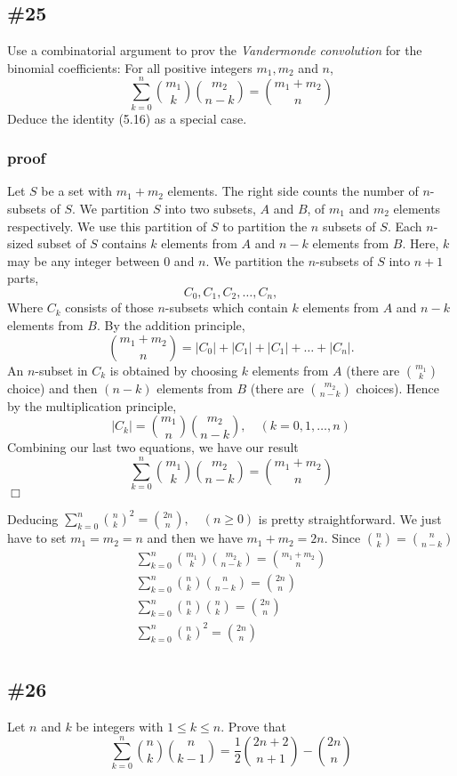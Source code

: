 \documentclass{article}
\newcommand{\abs}[1]{\left\lvert #1 \right\rvert}
\begin{document}
\subsection*{\#25}
Use a combinatorial argument to prov the \emph{Vandermonde convolution} for the binomial coefficients: For all positive integers $m_1,m_2$ and $n$,
\[\sum\limits_{k=0}^n{\binom{m_1}{k}\binom{m_2}{n-k}}=\binom{m_1+m_2}{n}\]
Deduce the identity (5.16) as a special case.
\subsubsection*{proof}
Let $S$ be a set with $m_1+m_2$ elements.
The right side counts the number of $n$-subsets of $S$.
We partition $S$ into two subsets, $A$ and $B$, of $m_1$ and $m_2$ elements respectively.
We use this partition of $S$ to partition the $n$ subsets of $S$.
Each $n$-sized subset of $S$ contains $k$ elements from $A$ and $n-k$ elements from $B$.
Here, $k$ may be any integer between $0$ and $n$.
We partition the $n$-subsets of $S$ into $n+1$ parts,
\[C_0,C_1,C_2,\dots,C_n,\]
Where $C_k$ consists of those $n$-subsets which contain $k$ elements from $A$ and $n-k$ elements from $B$. By the addition principle,
\[\binom{m_1+m_2}{n}=\abs{C_0}+\abs{C_1}+\abs{C_1}+\dots+\abs{C_n}.\]
An $n$-subset in $C_k$ is obtained by choosing $k$ elements from $A$ (there are $\binom{m_1}{k}$ choice) and then $(n-k)$ elements from $B$ (there are $\binom{m_2}{n-k}$ choices).
Hence by the multiplication principle,
\[\abs{C_k}=\binom{m_1}{n}\binom{m_2}{n-k},\quad(k=0,1,\dots,n)\]
Combining our last two equations, we have our result
\[\sum\limits_{k=0}^n{\binom{m_1}{k}\binom{m_2}{n-k}}=\binom{m_1+m_2}{n}\]
$\Box$

Deducing $\sum\limits_{k=0}^n{\binom{n}{k}^2}=\binom{2n}{n},\quad(n\ge 0)$ is pretty straightforward. We just have to set $m_1=m_2=n$ and then we have $m_1+m_2=2n$. Since $\binom{n}{k}=\binom{n}{n-k}$
\begin{align*}
  \sum\limits_{k=0}^n{\binom{m_1}{k}\binom{m_2}{n-k}}=\binom{m_1+m_2}{n}\\
  \sum\limits_{k=0}^n{\binom{n}{k}\binom{n}{n-k}}=\binom{2n}{n}\\
  \sum\limits_{k=0}^n{\binom{n}{k}\binom{n}{k}}=\binom{2n}{n}\\
  \sum\limits_{k=0}^n{\binom{n}{k}^2}=\binom{2n}{n}\\
\end{align*}
\subsection*{\#26}
Let $n$ and $k$ be integers with $1\le k\le n$. Prove that
\[\sum\limits_{k=0}^n{\binom{n}{k}\binom{n}{k-1}=\frac{1}{2}\binom{2n+2}{n+1}-\binom{2n}{n}}\]
\end{document}
